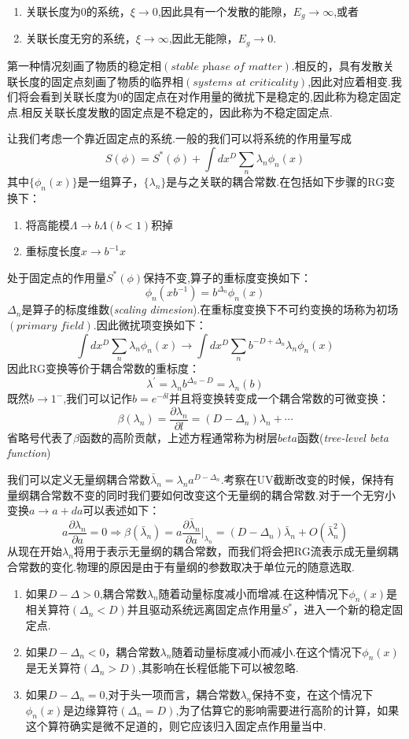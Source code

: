 \documentclass{ctexart}
\begin{document}
\begin{enumerate}
    \item 关联长度为0的系统，$\xi\rightarrow 0$,因此具有一个发散的能隙，$E_g\rightarrow \infty$,或者
    \item 关联长度无穷的系统，$\xi\rightarrow \infty$,因此无能隙，$E_g\rightarrow 0$.
\end{enumerate}
第一种情况刻画了物质的稳定相$(\textit{stable phase of matter})$.相反的，具有发散关联长度的固定点刻画了物质的临界相$(\textit{systems at criticality})$,因此对应着相变.我们将会看到关联长度为0的固定点在对作用量的微扰下是稳定的,因此称为稳定固定点.相反关联长度发散的固定点是不稳定的，因此称为不稳定固定点.\par 
让我们考虑一个靠近固定点的系统.一般的我们可以将系统的作用量写成
$$S(\phi)=S^*(\phi)+\int dx^D\sum_{n}\lambda_{n}\phi_n(x)$$
其中$\{\phi_n(x)\}$是一组算子，$\{\lambda_n\}$是与之关联的耦合常数.在包括如下步骤的RG变换下：
\begin{enumerate}
    \item 将高能模$\Lambda\rightarrow b\Lambda(b<1)$积掉
    \item 重标度长度$x\rightarrow b^{-1}x$
\end{enumerate}
处于固定点的作用量$S^*(\phi)$保持不变,算子的重标度变换如下：
$$\phi_n(xb^{-1})=b^{\Delta_n}\phi_n(x)$$
$\Delta_n$是算子的标度维数(\textit{scaling dimesion}).在重标度变换下不可约变换的场称为初场$(\textit{primary field})$.因此微扰项变换如下：
$$\int dx^D\sum_{n}\lambda_n\phi_n(x)\longrightarrow \int dx^D\sum_{n}b^{-D+\Delta_n}\lambda_n\phi_n(x)$$
因此RG变换等价于耦合常数的重标度：
$$\lambda^\prime=\lambda_nb^{\Delta_n-D}=\lambda_n(b)$$
既然$b\rightarrow 1^-$,我们可以记作$b=e^{-\delta l}$并且将变换转变成一个耦合常数的可微变换：
$$\beta(\lambda_n)=\frac{\partial\lambda_n}{\partial l}=(D-\Delta_n)\lambda_n+\cdots$$
省略号代表了$\beta$函数的高阶贡献，上述方程通常称为树层$beta$函数(\textit{tree-level beta function})\par 
我们可以定义无量纲耦合常数$\bar{\lambda}_n=\lambda_na^{D-\Delta_n}$.考察在UV截断改变的时候，保持有量纲耦合常数不变的同时我们要如何改变这个无量纲的耦合常数.对于一个无穷小变换$a\rightarrow a+da$可以表述如下：
$$a\frac{\partial\lambda_n}{\partial a}=0\Rightarrow \beta(\bar{\lambda}_n)=a\frac{\partial\bar{\lambda}_n}{\partial a}|_{\lambda_n}=(D-\Delta_n)\bar{\lambda}_n+O(\bar{\lambda}_n^2)$$
从现在开始$\lambda_n$将用于表示无量纲的耦合常数，而我们将会把RG流表示成无量纲耦合常数的变化.物理的原因是由于有量纲的参数取决于单位元的随意选取.\par 
\begin{enumerate}
    \item 如果$D-\Delta>0$,耦合常数$\lambda_n$随着动量标度减小而增减.在这种情况下$\phi_n(x)$是相关算符$(\Delta_n<D)$并且驱动系统远离固定点作用量$S^*$，进入一个新的稳定固定点.
    \item 如果$D-\Delta_n<0$，耦合常数$\lambda_n$随着动量标度减小而减小.在这个情况下$\phi_n(x)$是无关算符$(\Delta_n>D)$,其影响在长程低能下可以被忽略.
    \item 如果$D-\Delta_n=0$,对于头一项而言，耦合常数$\lambda_n$保持不变，在这个情况下$\phi_n(x)$是边缘算符$(\Delta_n=D)$,为了估算它的影响需要进行高阶的计算，如果这个算符确实是微不足道的，则它应该归入固定点作用量当中.
\end{enumerate}
\end{document}
